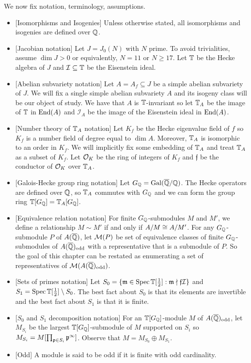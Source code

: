 \documentclass{article}
\newcommand{\f}{\mathfrak{f}}
\newcommand{\I}{\mathcal{I}}
\newcommand{\odd}{\mathrm{odd}}
\begin{document}
We now fix notation, terminology, assumptions.
\begin{itemize}
    \item{} [Isomorphisms and Isogenies]
        Unless otherwise stated, all isomorphisms and isogenies are defined
        over $\mathbb{Q}$.
    \item{} [Jacobian notation]
        Let $J = J_0(N)$ with $N$ prime. To avoid trivialities, assume $\dim
        J>0$ or equivalently, $N=11$ or $N\geq 17$. Let $\mathbb{T}$ be the Hecke
        algebra of $J$ and $\I\subseteq \TT$ be the Eisenstein ideal.
    \item{} [Abelian subvariety notation]
        Let $A=A_f\subseteq J$ be a simple abelian subvariety of $J$. We will
        fix a single simple abelian subvariety $A$ and its isogeny class will
        be our object of study. We have that $A$ is $\mathbb{T}$-invariant so let
        $\mathbb{T}_A$ be the image of $\mathbb{T}$ in $\operatorname{End}(A)$ and $\I_A$ be the image of
        the Eisenstein ideal in $\operatorname{End}(A)$. 
    \item{} [Number theory of $\mathbb{T}_A$ notation] 
        Let $K_f$ be the Hecke eigenvalue field of $f$ so $K_f$ is a number
        field of degree equal to $\dim A$. Moreover, $\mathbb{T}_A$ is isomorphic to
        an order in $K_f$. We will implicitly fix some embedding of $\mathbb{T}_A$ and
        treat $\mathbb{T}_A$ as a subset of $K_f$. Let $\mathcal{O}_K$ be the ring of integers
        of $K_f$ and $\f$ be the conductor of $\mathcal{O}_K$ over $\mathbb{T}_A$.
    \item{} [Galois-Hecke group ring notation]
        Let $G_{\mathbb{Q}}=\operatorname{Gal}(\overline{\mathbb{Q}}/\mathbb{Q})$. The Hecke operators are defined over
        $\mathbb{Q}$, so $\mathbb{T}_A$ commutes with $G_{\mathbb{Q}}$ and we can form the group ring
        $\mathbb{T}[G_{\mathbb{Q}}]=\mathbb{T}_A[G_{\mathbb{Q}}]$.
    \item{} [Equivalence relation notation]
        For finite $G_{\mathbb{Q}}$-submodules $M$ and $M'$, we define a relationship
        $M\sim M'$ if and only if $A/M \cong A/M'$. For any $G_{\mathbb{Q}}$-submodule
        $P$ of $A(\overline{\mathbb{Q}})$, let $\mathcal{M}(P)$ be set of equivalence classes of finite
        $G_{\mathbb{Q}}$-submodules of $A(\QQbar)_\odd$ with a representative that is a
        submodule of $P$. So the goal of this chapter can be restated as
        enumerating a set of representatives of $\M(A(\QQbar)_\odd)$.
    \item{} [Sets of primes notation]
        Let $S_0=\{\mathfrak{m}\in \operatorname{Spec}\mathbb{T}[\frac 12]: \mathfrak{m} \nmid
        \mathfrak{f}\mathcal{I}\}$ and $S_1 = \operatorname{Spec}\mathbb{T}[\frac 12]\setminus S_0$.
        The best fact about $S_0$ is that its elements are invertible and the
        best fact about $S_1$ is that it is finite.
    \item{} [$S_0$ and $S_1$ decomposition notation]
        For an $\mathbb{T}[G_{\mathbb{Q}}]$-module $M$ of $A(\QQbar)_\odd$, let $M_{S_i}$ be the largest
        $\mathbb{T}[G_{\mathbb{Q}}]$-submodule of $M$ supported on $S_i$ so $M_{S_i}=M[\prod_{\mathfrak{p}\in S_i}
        \mathfrak{p}^\infty]$. Observe that $M = M_{S_0}\oplus M_{S_1}$.
    \item{} [Odd]
        A module is said to be odd if it is finite with odd cardinality.
\end{itemize}
\end{document}
